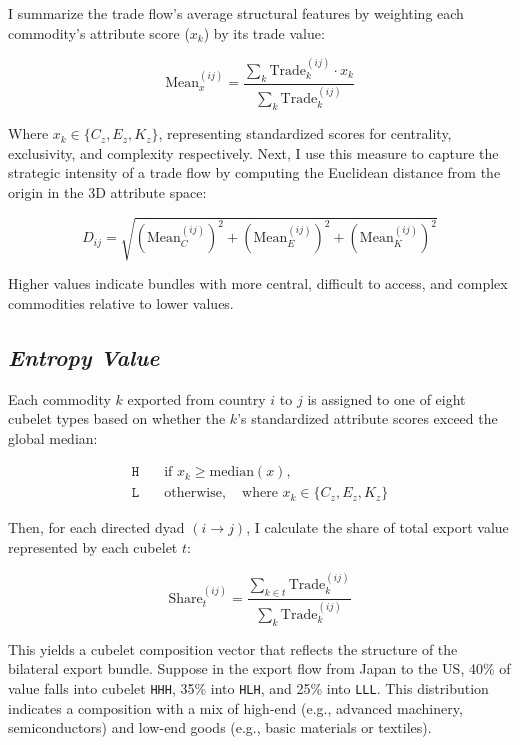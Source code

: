 \documentclass[12pt]{article}
\begin{document}
I summarize the trade flow’s average structural features by weighting each commodity’s attribute score ($x_k$) by its trade value:

\begin{equation}
\text{Mean}_x^{(ij)} = \frac{ \sum_{k} \text{Trade}_{k}^{(ij)} \cdot x_k }{ \sum_{k} \text{Trade}_{k}^{(ij)} }
\end{equation}

Where $x_k \in \{C_z, E_z, K_z\}$, representing standardized scores for centrality, exclusivity, and complexity respectively. Next, I use this measure to capture the strategic intensity of a trade flow by computing the Euclidean distance from the origin in the 3D attribute space:

\begin{equation}
D_{ij} = \sqrt{ \left( \text{Mean}_{C}^{(ij)} \right)^2 + \left( \text{Mean}_{E}^{(ij)} \right)^2 + \left( \text{Mean}_{K}^{(ij)} \right)^2 }
\end{equation}

Higher values indicate bundles with more central, difficult to access, and complex commodities relative to lower values.

\subsection*{\textit{Entropy Value}}

Each commodity $k$ exported from country $i$ to $j$ is assigned to one of eight cubelet types based on whether the $k$'s standardized attribute scores exceed the global median:

\begin{align*}
\texttt{H} &\quad \text{if } x_k \geq \text{median}(x), \\
\texttt{L} &\quad \text{otherwise}, \quad \text{where } x_k \in \{C_z, E_z, K_z\}
\end{align*}

Then, for each directed dyad $(i \rightarrow j)$, I calculate the share of total export value  represented by each cubelet $t$:

\begin{equation}
\text{Share}_{t}^{(ij)} = \frac{ \sum_{k \in t} \text{Trade}_{k}^{(ij)} }{ \sum_{k} \text{Trade}_{k}^{(ij)} }
\end{equation}


This yields a cubelet composition vector that reflects the structure of the bilateral export bundle. Suppose in the export flow from Japan to the US, 40\% of value falls into cubelet \texttt{HHH}, 35\% into \texttt{HLH}, and 25\% into \texttt{LLL}. This distribution indicates a composition with a mix of high-end  (e.g., advanced machinery, semiconductors) and low-end goods (e.g., basic materials or textiles). 
\end{document}
